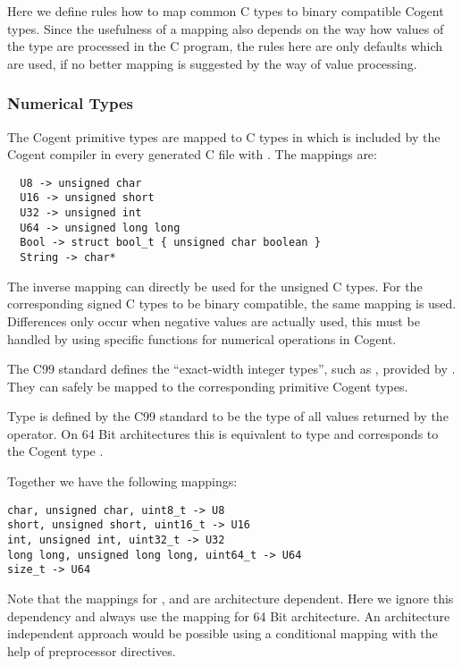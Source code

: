 
Here we define rules how to map common C types to binary compatible Cogent types. Since the usefulness of a mapping
also depends on the way how values of the type are processed in the C program, the rules here are only defaults
which are used, if no better mapping is suggested by the way of value processing.

\subsubsection{Numerical Types}

The Cogent primitive types are mapped to C types in  which is included by the Cogent compiler
in every generated C file with . The mappings are: 
\begin{verbatim}
  U8 -> unsigned char
  U16 -> unsigned short 
  U32 -> unsigned int
  U64 -> unsigned long long
  Bool -> struct bool_t { unsigned char boolean }
  String -> char*
\end{verbatim}
The inverse mapping can directly be used for the unsigned C types. For the corresponding signed C types to be binary
compatible, the same mapping is used. Differences only occur when negative values are actually used, this must be handled by using specific functions for numerical operations in Cogent.

The C99 standard defines the ``exact-width integer types'', such as , provided by . They can safely be mapped to the corresponding primitive Cogent types. 

Type  is defined by the C99 standard to be the type of all values returned by the  operator.
On 64 Bit architectures this is equivalent to type  and corresponds to the Cogent type .

Together we have the following mappings:
\begin{verbatim}
char, unsigned char, uint8_t -> U8
short, unsigned short, uint16_t -> U16
int, unsigned int, uint32_t -> U32
long long, unsigned long long, uint64_t -> U64
size_t -> U64
\end{verbatim}

Note that the mappings for ,  and  are architecture dependent. 
Here we ignore this dependency and always use the mapping for 64 Bit architecture. An architecture independent 
approach would be possible using a conditional mapping with the help of preprocessor  directives.

